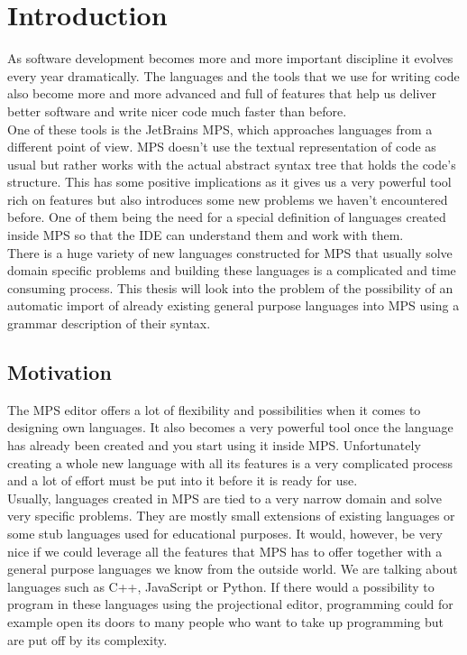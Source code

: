 \chapter{Introduction}

As software development becomes more and more important discipline it evolves every year dramatically. The languages and the tools that we use for writing code also become more and more advanced and full of features that help us deliver better software and write nicer code much faster than before. 
\\

One of these tools is the JetBrains MPS, which approaches languages from a different point of view. MPS doesn't use the textual representation of code as usual but rather works with the actual abstract syntax tree that holds the code's structure. This has some positive implications as it gives us a very powerful tool rich on features but also introduces some new problems we haven't encountered before. One of them being the need for a special definition of languages created inside MPS so that the IDE can understand them and work with them.
\\

There is a huge variety of new languages constructed for MPS that usually solve domain specific problems and building these languages is a complicated and time consuming process. This thesis will look into the problem of the possibility of an automatic import of already existing general purpose languages into MPS using a grammar description of their syntax.


\section{Motivation}

The MPS editor offers a lot of flexibility and possibilities when it comes to designing own languages. It also becomes a very powerful tool once the language has already been created and you start using it inside MPS. Unfortunately creating a whole new language with all its features is a very complicated process and a lot of effort must be put into it before it is ready for use.
\\

Usually, languages created in MPS are tied to a very narrow domain and solve very specific problems. They are mostly small extensions of existing languages or some stub languages used for educational purposes. It would, however, be very nice if we could leverage all the features that MPS has to offer together with a general purpose languages we know from the outside world. We are talking about languages such as C++, JavaScript or Python. If there would a possibility to program in these languages using the projectional editor, programming could for example open its doors to many people who want to take up programming but are put off by its complexity.
\\

